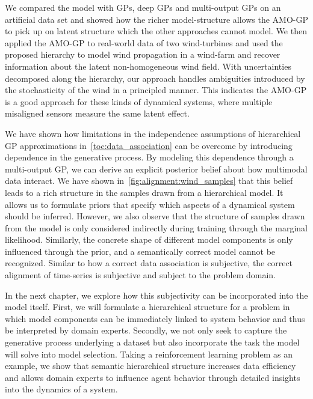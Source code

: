 We compared the model with GPs, deep GPs and multi-output GPs on an artificial data set and showed how the richer model-structure allows the AMO-GP to pick up on latent structure which the other approaches cannot model.
We then applied the AMO-GP to real-world data of two wind-turbines and used the proposed hierarchy to model wind propagation in a wind-farm and recover information about the latent non-homogeneous wind field.
With uncertainties decomposed along the hierarchy, our approach handles ambiguities introduced by the stochasticity of the wind in a principled manner.
This indicates the AMO-GP is a good approach for these kinds of dynamical systems, where multiple misaligned sensors measure the same latent effect.

We have shown how limitations in the independence assumptions of hierarchical GP approximations in~\cref{toc:data_association} can be overcome by introducing dependence in the generative process.
By modeling this dependence through a multi-output GP, we can derive an explicit posterior belief about how multimodal data interact.
We have shown in~\cref{fig:alignment:wind_samples} that this belief leads to a rich structure in the samples drawn from a hierarchical model.
It allows us to formulate priors that specify which aspects of a dynamical system should be inferred.
However, we also observe that the structure of samples drawn from the model is only considered indirectly during training through the marginal likelihood.
Similarly, the concrete shape of different model components is only influenced through the prior, and a semantically correct model cannot be recognized.
Similar to how a correct data association is subjective, the correct alignment of time-series is subjective and subject to the problem domain.

In the next chapter, we explore how this subjectivity can be incorporated into the model itself.
First, we will formulate a hierarchical structure for a problem in which model components can be immediately linked to system behavior and thus be interpreted by domain experts.
Secondly, we not only seek to capture the generative process underlying a dataset but also incorporate the task the model will solve into model selection.
Taking a reinforcement learning problem as an example, we show that semantic hierarchical structure increases data efficiency and allows domain experts to influence agent behavior through detailed insights into the dynamics of a system.
